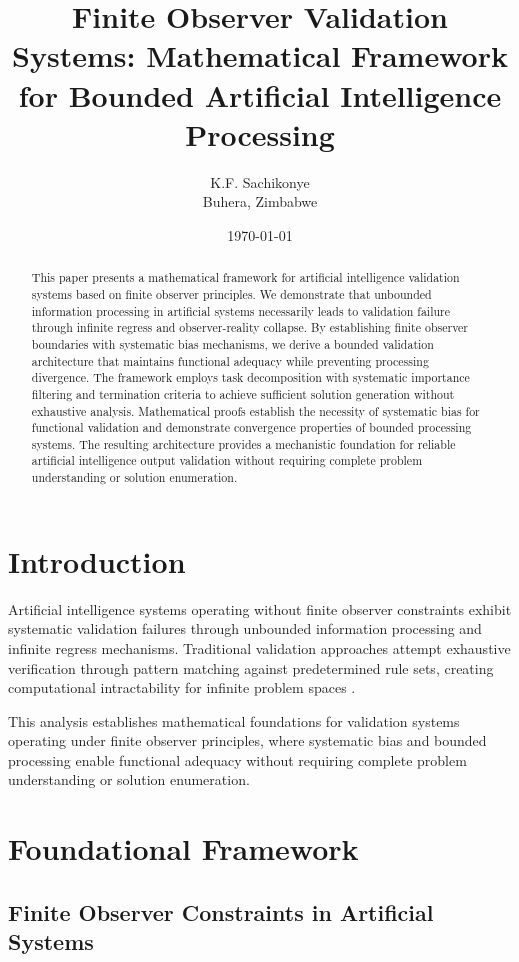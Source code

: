 \documentclass[12pt,a4paper]{article}
\title{Finite Observer Validation Systems: Mathematical Framework for Bounded Artificial Intelligence Processing}
\author{
K.F. Sachikonye\\
Buhera, Zimbabwe
}
\date{\today}
\begin{document}
\maketitle

\begin{abstract}
This paper presents a mathematical framework for artificial intelligence validation systems based on finite observer principles. We demonstrate that unbounded information processing in artificial systems necessarily leads to validation failure through infinite regress and observer-reality collapse. By establishing finite observer boundaries with systematic bias mechanisms, we derive a bounded validation architecture that maintains functional adequacy while preventing processing divergence. The framework employs task decomposition with systematic importance filtering and termination criteria to achieve sufficient solution generation without exhaustive analysis. Mathematical proofs establish the necessity of systematic bias for functional validation and demonstrate convergence properties of bounded processing systems. The resulting architecture provides a mechanistic foundation for reliable artificial intelligence output validation without requiring complete problem understanding or solution enumeration.
\end{abstract}

\section{Introduction}

Artificial intelligence systems operating without finite observer constraints exhibit systematic validation failures through unbounded information processing and infinite regress mechanisms. Traditional validation approaches attempt exhaustive verification through pattern matching against predetermined rule sets, creating computational intractability for infinite problem spaces \citep{turing1936,church1936}.

This analysis establishes mathematical foundations for validation systems operating under finite observer principles, where systematic bias and bounded processing enable functional adequacy without requiring complete problem understanding or solution enumeration.

\section{Foundational Framework}

\subsection{Finite Observer Constraints in Artificial Systems}
\end{document}
